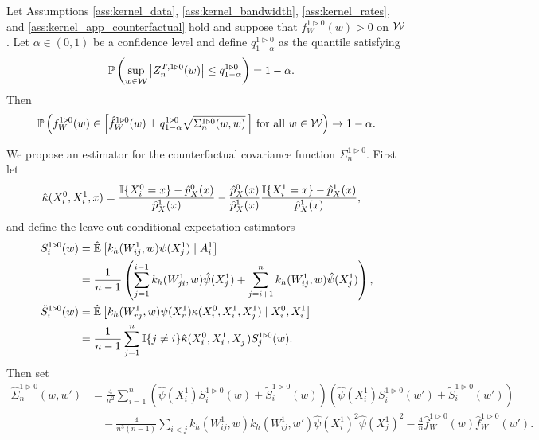 \begin{theorem}
  \label{thm:kernel_app_counterfactual_infeasible_ucb}

  Let Assumptions \ref{ass:kernel_data}, \ref{ass:kernel_bandwidth},
  \ref{ass:kernel_rates}, and \ref{ass:kernel_app_counterfactual}
  hold and suppose that $f_W^{1 \triangleright 0}(w) > 0$ on $\mathcal{W}$.
  Let $\alpha \in (0,1)$ be a confidence level
  and define $q^{1 \triangleright 0}_{1-\alpha}$ as the quantile
  satisfying
  \begin{align*}
    \mathbb{P}\left(
      \sup_{w \in \mathcal{W}}
      \left| Z_n^{T,1 \triangleright 0}(w) \right|
      \leq q^{1 \triangleright 0}_{1-\alpha}
    \right)
    &=
    1 - \alpha.
  \end{align*}
  Then
  \begin{align*}
    \mathbb{P}\left(
      f_W^{1 \triangleright 0}(w)
      \in
      \left[
        \hat f_W^{1 \triangleright 0}(w)
        \pm
        q^{1 \triangleright 0}_{1-\alpha}
        \sqrt{\Sigma_n^{1 \triangleright 0}(w,w)}
      \, \right]
      \, \textup{for all }
      w \in \mathcal{W}
    \right)
    \to 1 - \alpha.
  \end{align*}
\end{theorem}
%
We propose an estimator for the counterfactual covariance function
$\Sigma_n^{1 \triangleright 0}$. First let
%
\begin{align*}
  \hat\kappa(X_i^0, X_i^1, x)
  &=
  \frac{\mathbb{I}\{X_i^0 = x\} - \hat p_X^0(x)}{\hat p_X^1(x)}
  - \frac{\hat p_X^0(x)}{\hat p_X^1(x)}
  \frac{\mathbb{I}\{X_i^1 = x\} - \hat p_X^1(x)}{\hat p_X^1(x)},
\end{align*}
%
and define the leave-out conditional expectation estimators
%
\begin{align*}
  S_i^{1 \triangleright 0}(w)
  &=
  \hat{\mathbb{E}}\left[
    k_h(W_{i j}^1,w) \psi(X_j^1) \mid A_i^1
  \right] \\
  &=
  \frac{1}{n-1}
  \left(
    \sum_{j=1}^{i-1}
    k_h(W_{j i}^1,w) \hat\psi(X_j^1)
    + \sum_{j=i+1}^n
    k_h(W_{i j}^1,w) \hat\psi(X_j^1)
  \right), \\
  \tilde S_i^{1 \triangleright 0}(w)
  &=
  \hat{\mathbb{E}}\left[
    k_h(W_{r j}^1,w) \psi(X_r^1)
    \kappa(X_i^0, X_i^1, X_j^1) \mid X_i^0, X_i^1
  \right] \\
  &=
  \frac{1}{n-1}
  \sum_{j=1}^n
  \mathbb{I}\{j \neq i\}
  \hat\kappa(X_i^0, X_i^1, X_j^1)
  S_j^{1 \triangleright 0}(w).
\end{align*}
%
Then set
%
\begin{align*}
  \hat\Sigma_n^{1 \triangleright 0}(w,w')
  &=
  \frac{4}{n^2}
  \sum_{i=1}^n
  \left(
    \hat\psi(X_i^1)
    S_i^{1 \triangleright 0}(w)
    + \tilde S_i^{1 \triangleright 0}(w)
  \right)
  \left(
    \hat\psi(X_i^1)
    S_i^{1 \triangleright 0}(w')
    + \tilde S_i^{1 \triangleright 0}(w')
  \right) \\
  &\quad-
  \frac{4}{n^3(n-1)}
  \sum_{i<j}
  k_h(W_{i j}^1, w)
  k_h(W_{i j}^1, w')
  \hat\psi(X_i^1)^2
  \hat\psi(X_j^1)^2
  - \frac{4}{n}
  \hat f_W^{1 \triangleright 0}(w)
  \hat f_W^{1 \triangleright 0}(w').
\end{align*}
